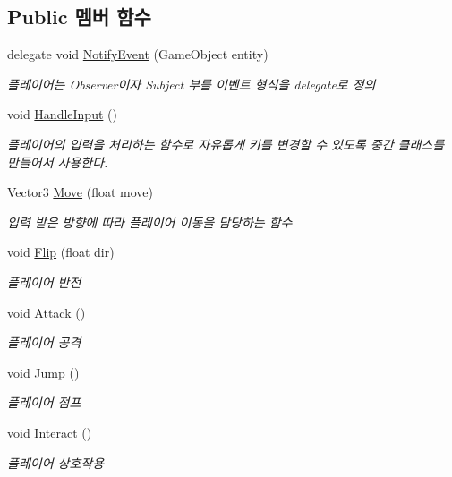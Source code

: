 \subsection*{Public 멤버 함수}
\begin{DoxyCompactItemize}
\item 
delegate void \mbox{\hyperlink{class_player_controller_a934c7f80b80276620cd60eaaeea7520e}{Notify\+Event}} (Game\+Object entity)
\begin{DoxyCompactList}\small\item\em 플레이어는 Observer이자 Subject 부를 이벤트 형식을 delegate로 정의 \end{DoxyCompactList}\item 
void \mbox{\hyperlink{class_player_controller_a5ebfe098b2dc258ca8349e6951766883}{Handle\+Input}} ()
\begin{DoxyCompactList}\small\item\em 플레이어의 입력을 처리하는 함수로 자유롭게 키를 변경할 수 있도록 중간 클래스를 만들어서 사용한다. \end{DoxyCompactList}\item 
Vector3 \mbox{\hyperlink{class_player_controller_a50157884365897164379b8bad7ee4722}{Move}} (float move)
\begin{DoxyCompactList}\small\item\em 입력 받은 방향에 따라 플레이어 이동을 담당하는 함수 \end{DoxyCompactList}\item 
void \mbox{\hyperlink{class_player_controller_a4cc61bc6a9187892458138a1d0ffc207}{Flip}} (float dir)
\begin{DoxyCompactList}\small\item\em 플레이어 반전 \end{DoxyCompactList}\item 
void \mbox{\hyperlink{class_player_controller_a473a610cfe2a374d5cb39b3c44881d11}{Attack}} ()
\begin{DoxyCompactList}\small\item\em 플레이어 공격 \end{DoxyCompactList}\item 
void \mbox{\hyperlink{class_player_controller_a8a7010cb6f3c524737be3f6f77553df9}{Jump}} ()
\begin{DoxyCompactList}\small\item\em 플레이어 점프 \end{DoxyCompactList}\item 
void \mbox{\hyperlink{class_player_controller_a1f27776786e67be2633f94b97c93ebdc}{Interact}} ()
\begin{DoxyCompactList}\small\item\em 플레이어 상호작용 \end{DoxyCompactList}\end{DoxyCompactItemize}
